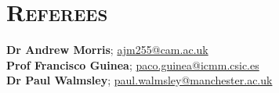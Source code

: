 \documentclass[11pt,a4paper]{moderncv}   %
\newcommand\Colorhref[3][color2]{\href{#2}{\color{#1}#3}}
\begin{document}
\section{\textsc{\Large{Referees}}}
\small{
\hspace*{2.5cm}\textbf{Dr Andrew Morris}; \Colorhref{mailto:ajm255@cam.ac.uk}{ajm255@cam.ac.uk}\\
\hspace*{2.5cm}\textbf{Prof Francisco Guinea}; \Colorhref{mailto:paco.guinea@icmm.csic.es}{paco.guinea@icmm.csic.es}\\
\hspace*{2.5cm}\textbf{Dr Paul Walmsley}; \Colorhref{mailto:paul.walmsley@manchester.ac.uk}{paul.walmsley@manchester.ac.uk}}
\nocite{*}
\small{

}
\clearpage
\end{document}
